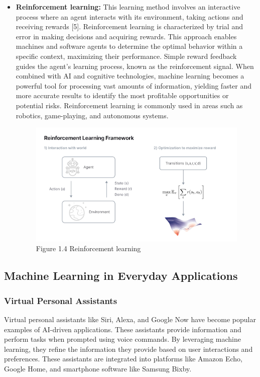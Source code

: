 \begin{itemize}
\item\textbf{Reinforcement learning:} This learning method involves an interactive process where an agent interacts with its environment, taking actions and receiving rewards [5]. Reinforcement learning is characterized by trial and error in making decisions and acquiring rewards. This approach enables machines and software agents to determine the optimal behavior within a specific context, maximizing their performance. Simple reward feedback guides the agent's learning process, known as the reinforcement signal. When combined with AI and cognitive technologies, machine learning becomes a powerful tool for processing vast amounts of information, yielding faster and more accurate results to identify the most profitable opportunities or potential risks. Reinforcement learning is commonly used in areas such as robotics, game-playing, and autonomous systems.
\begin{center}
    \begin{figure}[!htp]
        \centering
        \includegraphics[width=0.8 \textwidth]{image/reinforcement_learning.png}
        \caption{Figure 1.4 Reinforcement learning}
        \label{subsection}
    \end{figure}
\end{center}
\end{itemize}

\subsection{Machine Learning in Everyday Applications}
\subsubsection{Virtual Personal Assistants}
Virtual personal assistants like Siri, Alexa, and Google Now have become popular examples of AI-driven applications. These assistants provide information and perform tasks when prompted using voice commands. By leveraging machine learning, they refine the information they provide based on user interactions and preferences. 
These assistants are integrated into platforms like Amazon Echo, Google Home, and smartphone software like Samsung Bixby.
